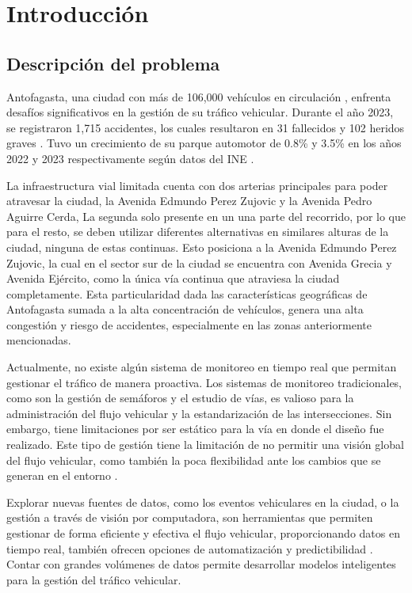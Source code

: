 \documentclass[12pt]{article}
\begin{document}
\section{Introducción}
\subsection{Descripción del problema}

Antofagasta, una ciudad con más de 106,000 vehículos en circulación \parencite{conaset2023}, enfrenta desafíos significativos en la gestión de su tráfico vehicular. Durante el año 2023, se registraron 1,715 accidentes, los cuales resultaron en 31 fallecidos y 102 heridos graves \parencite{conaset2023}. Tuvo un crecimiento de su parque automotor de 0.8\% y 3.5\% en los años 2022 y 2023 respectivamente según datos del INE \parencite{ine2023}.

La infraestructura vial limitada cuenta con dos arterias principales para poder atravesar la ciudad, la Avenida Edmundo Perez Zujovic y la Avenida Pedro Aguirre Cerda, La segunda solo presente en un una parte del recorrido, por lo que para el resto, se deben utilizar diferentes alternativas en similares alturas de la ciudad, ninguna de estas continuas. Esto posiciona a la Avenida Edmundo Perez Zujovic, la cual en el sector sur de la ciudad se encuentra con Avenida Grecia y Avenida Ejército, como la única vía continua que atraviesa la ciudad completamente. Esta particularidad dada las características geográficas de Antofagasta sumada a la alta concentración de vehículos, genera una alta congestión y  riesgo de accidentes, especialmente en las zonas anteriormente mencionadas.

Actualmente, no existe algún sistema de monitoreo en tiempo real que permitan gestionar el tráfico de manera proactiva. Los sistemas de monitoreo tradicionales, como son la gestión de semáforos y el estudio de vías, es valioso para la administración del flujo vehicular y la estandarización de las intersecciones. Sin embargo, tiene limitaciones por ser estático para la vía en donde el diseño fue realizado. Este tipo de gestión tiene la limitación de no permitir una visión global del flujo vehicular, como también la poca flexibilidad ante los cambios que se generan en el entorno \parencite{auld2009}.

Explorar nuevas fuentes de datos, como los eventos vehiculares en la ciudad, o la gestión a través de visión por computadora, son herramientas que permiten gestionar de forma eficiente y efectiva el flujo vehicular, proporcionando datos en tiempo real, también ofrecen opciones de automatización y predictibilidad \parencite{chen2015}. Contar con grandes volúmenes de datos permite desarrollar modelos inteligentes para la gestión del tráfico vehicular.
\end{document}
